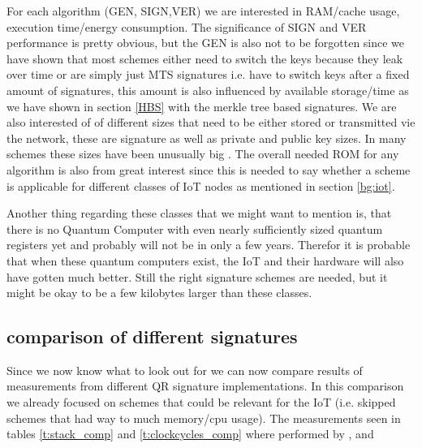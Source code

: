 \documentclass[conference]{IEEEtran}
\newcommand{\comment}[1]{}
\begin{document}
For each algorithm (GEN, SIGN,VER) we are interested in RAM/cache usage, execution time/energy consumption.
The significance of SIGN and VER performance is pretty obvious, but the GEN is also not to be forgotten since we have shown that most schemes either need to switch the keys because they leak over time or are simply just MTS signatures i.e. have to switch keys after a fixed amount of signatures, this amount is also influenced by available storage/time as we have shown in section \ref{HBS} with the merkle tree based signatures.
We are also interested of of different sizes that need to be either stored or transmitted vie the network, these are signature as well as private and public key sizes. In many schemes these sizes have been unusually big \cite{QR_comparison}.
The overall needed ROM for any algorithm is also from great interest since this is needed to say whether a scheme is applicable for different classes of IoT nodes as mentioned in section \ref{bg:iot}.

Another thing regarding these classes that we might want to mention is, that there is no Quantum Computer with even nearly sufficiently sized quantum registers yet and probably will not be in only a few years. Therefor it is probable that when these quantum computers exist, the IoT and their hardware will also have gotten much better. Still the right signature schemes are needed, but it might be okay to be a few kilobytes larger than these classes.  

\subsection{comparison of different signatures}
\comment{ %
Stack usage:
    name            & KeyGen    & Sign  & Verify
    Dilithium-3     & 50k       & 86k   & 54k
    newer dil(dyn)  & not meas  & 52k   & 36k \cite{update_sign}
    newer dil(sta)  & aheadOf t & 35k   & 19k \cite{update_sign}
    qTESLA-1        & 22k       & 29k   & 23k
    qTESLA-3        & 43k       & 28k   & 45k
    Falcon-5        & 120k      & 120k  & 120k
    newer FALCON    & not meas  & 42k   & 4.7k \cite{update_sign}

Clock cycles (10mil ~ 60ms (ARM M4 (168Mhz))):
    name        & KeyGen    & Sign  & Verify
    Dilithium-3 & 2.3m      & 8.3m  & 2.3m
    Dilithium-3 & 2.1       & 7.2   & 2.1 \cite{Energy_comp}
    Falcon-5    & 365m      & 165m  & 1m
    Falcon      & note meas & 75m   & 1m \cite{update_sign}
    qTESLA-3    & 30m       & 11m   & 2.2m
    \cite{QR_Iot_Lattice}

Hash-Based Sphincs promising since stateless, but many parameters to set \cite{QR_IoT_Energy}

as of \cite{QR_comparison} only schemes (out of ~50) with < 4kbit: SIKE and Round5 
} %
Since we now know what to look out for we can now compare results of measurements from different QR signature implementations.
In this comparison we already focused on schemes that could be relevant for the IoT (i.e. skipped schemes that had way to much memory/cpu usage).
The measurements seen in tables \ref{t:stack_comp} and \ref{t:clockcycles_comp}
where performed by \cite{QR_comparison},\cite{Energy_comp} and \cite{update_sign}
\end{document}
